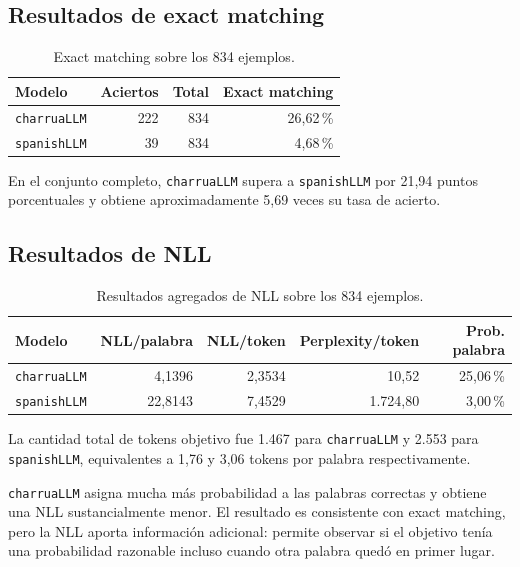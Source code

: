 \documentclass[11pt,a4paper]{article}
\newcommand{\charrua}{\texttt{charruaLLM}}
\newcommand{\spanishmodel}{\texttt{spanishLLM}}
\begin{document}
\subsection{Resultados de exact matching}

\begin{table}[H]
    \centering
    \caption{Exact matching sobre los 834 ejemplos.}
    \label{tab:exact-global}
    \begin{tabular}{lrrr}
        \toprule
        Modelo & Aciertos & Total & Exact matching \\
        \midrule
        \charrua & 222 & 834 & 26,62\,\% \\
        \spanishmodel & 39 & 834 & 4,68\,\% \\
        \bottomrule
    \end{tabular}
\end{table}

En el conjunto completo, \charrua{} supera a \spanishmodel{} por 21,94 puntos
porcentuales y obtiene aproximadamente 5,69 veces su tasa de acierto.


\subsection{Resultados de NLL}

\begin{table}[H]
    \centering
    \small
    \caption{Resultados agregados de NLL sobre los 834 ejemplos.}
    \label{tab:nll-global}
    \begin{tabular}{lrrrr}
        \toprule
        Modelo & NLL/palabra & NLL/token & Perplexity/token & Prob. palabra \\
        \midrule
        \charrua & 4,1396 & 2,3534 & 10,52 & 25,06\,\% \\
        \spanishmodel & 22,8143 & 7,4529 & 1.724,80 & 3,00\,\% \\
        \bottomrule
    \end{tabular}
\end{table}

La cantidad total de tokens objetivo fue 1.467 para \charrua{} y 2.553 para
\spanishmodel, equivalentes a 1,76 y 3,06 tokens por palabra respectivamente.

\charrua{} asigna mucha más probabilidad a las palabras correctas y obtiene una
NLL sustancialmente menor. El resultado es consistente con exact matching, pero
la NLL aporta información adicional: permite observar si el objetivo tenía una
probabilidad razonable incluso cuando otra palabra quedó en primer lugar.
\end{document}
